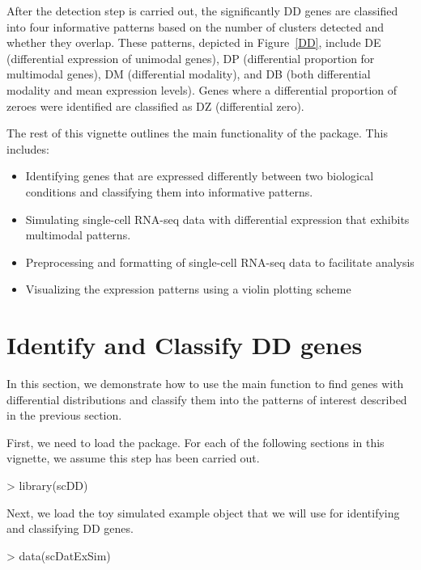 \documentclass{article}
\begin{document}
After the detection step is carried out, the significantly DD genes are classified into four informative patterns based on the number of clusters detected and whether they overlap.  These patterns, depicted in Figure~\ref{DD}, include DE (differential expression of unimodal genes), DP (differential proportion for multimodal genes), DM (differential modality), and DB (both differential modality and mean expression levels).  Genes where a differential proportion of zeroes were identified are classified as DZ (differential zero).


The rest of this vignette outlines the main functionality of the  package.  This includes:

\begin{itemize}
  \item Identifying genes that are expressed differently between two biological conditions and classifying them into informative patterns.
  \item Simulating single-cell RNA-seq data with differential expression that exhibits multimodal patterns.
  \item Preprocessing and formatting of single-cell RNA-seq data to facilitate analysis
  \item Visualizing the expression patterns using a violin plotting scheme
\end{itemize}

\section{Identify and Classify DD genes}
In this section, we demonstrate how to use the main function  to find genes with differential distributions and classify them into the patterns of interest described in the previous section. 

First, we need to load the  package.  For each of the following sections in this vignette, we assume this step has been carried out.
\begin{Schunk}
\begin{Sinput}
> library(scDD)
\end{Sinput}
\end{Schunk}

Next, we load the toy simulated example  object that we will use for identifying and classifying DD genes.
\begin{Schunk}
\begin{Sinput}
> data(scDatExSim)
\end{Sinput}
\end{Schunk}
\end{document}

